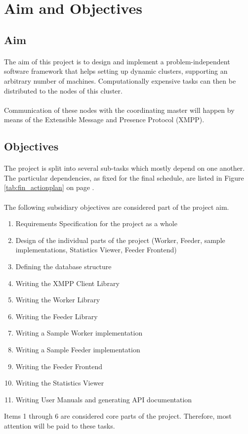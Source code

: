 \section{Aim and Objectives}

\subsection{Aim}
\paragraph{}
The aim of this project is to design and implement a prob\-lem-in\-de\-pen\-dent software framework that helps setting up dynamic clusters, supporting an arbitrary number of machines. Computationally expensive tasks can then be distributed to the nodes of this cluster.
\paragraph{}
Communication of these nodes with the coordinating master will happen by means of the Extensible Message and Presence Protocol (XMPP).

\subsection{Objectives}
\paragraph{}
The project is split into several sub-tasks which mostly depend on one another. The particular dependencies, as fixed for the final schedule, are listed in Figure \ref{tab:fin_actionplan} on page \pageref{tab:fin_actionplan}.

\paragraph{}
The following subsidiary objectives are considered part of the project aim.
\begin{enumerate}
\item Requirements Specification for the project as a whole
\item Design of the individual parts of the project (Worker, Feeder, sample implementations, Statistics Viewer, Feeder Frontend)
\item Defining the database structure
\item Writing the XMPP Client Library
\item Writing the Worker Library
\item Writing the Feeder Library
\item Writing a Sample Worker implementation
\item Writing a Sample Feeder implementation
\item Writing the Feeder Frontend
\item Writing the Statistics Viewer
\item Writing User Manuals and generating API documentation
\end{enumerate}
Items 1 through 6 are considered core parts of the project. Therefore, most attention will be paid to these tasks.

